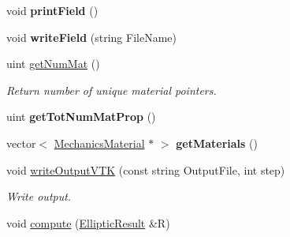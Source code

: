 \begin{DoxyCompactItemize}
\item 
\hypertarget{classvoom_1_1_mechanics_model_a480eb55c51af65ab16e8ecfb3861645e}{
void {\bfseries printField} ()}
\label{classvoom_1_1_mechanics_model_a480eb55c51af65ab16e8ecfb3861645e}

\item 
\hypertarget{classvoom_1_1_mechanics_model_ab314844c35d008119a81b2e6e8733e78}{
void {\bfseries writeField} (string FileName)}
\label{classvoom_1_1_mechanics_model_ab314844c35d008119a81b2e6e8733e78}

\item 
\hypertarget{classvoom_1_1_mechanics_model_aca42881f09a84c766baf127d45f2fef8}{
uint \hyperlink{classvoom_1_1_mechanics_model_aca42881f09a84c766baf127d45f2fef8}{getNumMat} ()}
\label{classvoom_1_1_mechanics_model_aca42881f09a84c766baf127d45f2fef8}

\begin{DoxyCompactList}\small\item\em Return number of unique material pointers. \item\end{DoxyCompactList}\item 
\hypertarget{classvoom_1_1_mechanics_model_a10c046adfe42363ef28fb39009269d8e}{
uint {\bfseries getTotNumMatProp} ()}
\label{classvoom_1_1_mechanics_model_a10c046adfe42363ef28fb39009269d8e}

\item 
\hypertarget{classvoom_1_1_mechanics_model_a343ac46fc7ada32bf24f7be43410888e}{
vector$<$ \hyperlink{classvoom_1_1_mechanics_material}{MechanicsMaterial} $\ast$ $>$ {\bfseries getMaterials} ()}
\label{classvoom_1_1_mechanics_model_a343ac46fc7ada32bf24f7be43410888e}

\item 
\hypertarget{classvoom_1_1_mechanics_model_aa93918325d4e859b84d5d94b48a1ee0a}{
void \hyperlink{classvoom_1_1_mechanics_model_aa93918325d4e859b84d5d94b48a1ee0a}{writeOutputVTK} (const string OutputFile, int step)}
\label{classvoom_1_1_mechanics_model_aa93918325d4e859b84d5d94b48a1ee0a}

\begin{DoxyCompactList}\small\item\em Write output. \item\end{DoxyCompactList}\item 
\hypertarget{classvoom_1_1_mechanics_model_af61f345ea01fad5a81546b7511a7dada}{
void \hyperlink{classvoom_1_1_mechanics_model_af61f345ea01fad5a81546b7511a7dada}{compute} (\hyperlink{structvoom_1_1_elliptic_result}{EllipticResult} \&R)}
\label{classvoom_1_1_mechanics_model_af61f345ea01fad5a81546b7511a7dada}


\end{DoxyCompactItemize}

